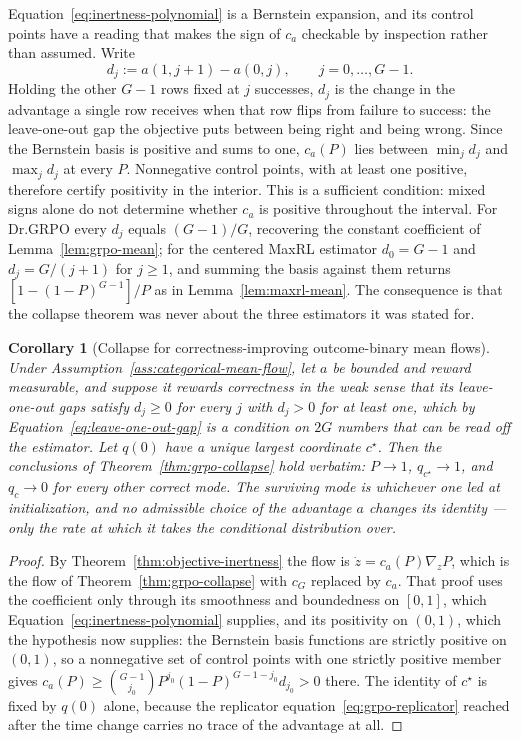 \documentclass{article}
\newcommand{\1}{\mathbf 1}
\newtheorem{corollary}[lemma]{Corollary}
\theoremstyle{remark}
\theoremstyle{definition}
\theoremstyle{plain}
\begin{document}
Equation~\eqref{eq:inertness-polynomial} is a Bernstein expansion, and its
control points have a reading that makes the sign of $c_a$ checkable by
inspection rather than assumed. Write
\begin{equation}
 d_j:=a(1,j+1)-a(0,j),\qquad j=0,\ldots,G-1 .
 \label{eq:leave-one-out-gap}
\end{equation}
Holding the other $G-1$ rows fixed at $j$ successes, $d_j$ is the change in the
advantage a single row receives when that row flips from failure to success:
the leave-one-out gap the objective puts between being right and being wrong.
Since the Bernstein basis is positive and sums to one, $c_a(P)$ lies between
$\min_jd_j$ and $\max_jd_j$ at every $P$. Nonnegative control points,
with at least one positive, therefore certify positivity in the interior.
This is a sufficient condition: mixed signs alone do not determine whether
$c_a$ is positive throughout the interval.
For Dr.GRPO every $d_j$ equals $(G-1)/G$, recovering the constant coefficient
of Lemma~\ref{lem:grpo-mean}; for the centered MaxRL estimator $d_0=G-1$ and
$d_j=G/(j+1)$ for $j\ge1$, and summing the basis against them returns
$[1-(1-P)^{G-1}]/P$ as in Lemma~\ref{lem:maxrl-mean}. The consequence is that
the collapse theorem was never about the three estimators it was stated for.

\begin{corollary}[Collapse for correctness-improving outcome-binary mean flows]
\label{cor:class-collapse}
Under Assumption~\ref{ass:categorical-mean-flow}, let $a$ be bounded and
reward measurable, and suppose it rewards correctness in the weak sense that
its leave-one-out gaps satisfy $d_j\ge0$ for every $j$ with $d_j>0$ for at
least one, which by Equation~\eqref{eq:leave-one-out-gap} is a condition on
$2G$ numbers that can be read off the estimator. Let $q(0)$ have a unique
largest coordinate $c^\star$. Then the conclusions of Theorem~\ref{thm:grpo-collapse}
hold verbatim: $P\to1$, $q_{c^\star}\to1$, and $q_c\to0$ for every other
correct mode. The surviving mode is whichever one led at initialization, and
no admissible choice of the advantage $a$ changes its identity --- only the
rate at which it takes the conditional distribution over.
\end{corollary}

\begin{proof}
By Theorem~\ref{thm:objective-inertness} the flow is
$\dot z=c_a(P)\nabla_zP$, which is the flow of
Theorem~\ref{thm:grpo-collapse} with $c_G$ replaced by $c_a$. That proof uses
the coefficient only through its smoothness and boundedness on $[0,1]$, which
Equation~\eqref{eq:inertness-polynomial} supplies, and its positivity on
$(0,1)$, which the hypothesis now supplies: the Bernstein basis functions are
strictly positive on $(0,1)$, so a nonnegative set of control points with one
strictly positive member gives $c_a(P)\ge\binom{G-1}{j_0}P^{j_0}(1-P)^{G-1-j_0}
d_{j_0}>0$ there. The identity of $c^\star$ is fixed by $q(0)$ alone, because
the replicator equation~\eqref{eq:grpo-replicator} reached after the time
change carries no trace of the advantage at all.
\end{proof}
\end{document}
